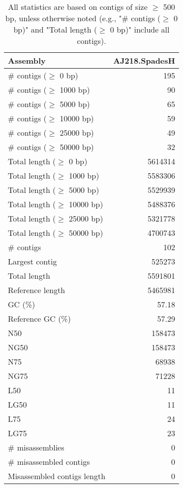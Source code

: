 \documentclass[12pt,a4paper]{article}
\begin{document}
\begin{table}[ht]
\begin{center}
\caption{All statistics are based on contigs of size $\geq$ 500 bp, unless otherwise noted (e.g., "\# contigs ($\geq$ 0 bp)" and "Total length ($\geq$ 0 bp)" include all contigs).}
\begin{tabular}{|l*{1}{|r}|}
\hline
Assembly & AJ218.SpadesH \\ \hline
\# contigs ($\geq$ 0 bp) & 195 \\ \hline
\# contigs ($\geq$ 1000 bp) & 90 \\ \hline
\# contigs ($\geq$ 5000 bp) & 65 \\ \hline
\# contigs ($\geq$ 10000 bp) & 59 \\ \hline
\# contigs ($\geq$ 25000 bp) & 49 \\ \hline
\# contigs ($\geq$ 50000 bp) & 32 \\ \hline
Total length ($\geq$ 0 bp) & 5614314 \\ \hline
Total length ($\geq$ 1000 bp) & 5583306 \\ \hline
Total length ($\geq$ 5000 bp) & 5529939 \\ \hline
Total length ($\geq$ 10000 bp) & 5488376 \\ \hline
Total length ($\geq$ 25000 bp) & 5321778 \\ \hline
Total length ($\geq$ 50000 bp) & 4700743 \\ \hline
\# contigs & 102 \\ \hline
Largest contig & 525273 \\ \hline
Total length & 5591801 \\ \hline
Reference length & 5465981 \\ \hline
GC (\%) & 57.18 \\ \hline
Reference GC (\%) & 57.29 \\ \hline
N50 & 158473 \\ \hline
NG50 & 158473 \\ \hline
N75 & 68938 \\ \hline
NG75 & 71228 \\ \hline
L50 & 11 \\ \hline
LG50 & 11 \\ \hline
L75 & 24 \\ \hline
LG75 & 23 \\ \hline
\# misassemblies & 0 \\ \hline
\# misassembled contigs & 0 \\ \hline
Misassembled contigs length & 0 \\ \hline

\end{tabular}
\end{center}
\end{table}
\end{document}
